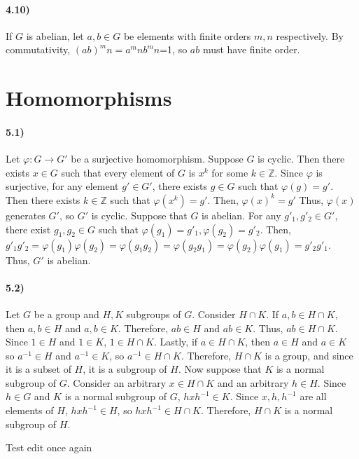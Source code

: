 \documentclass{article}
\begin{document}
\paragraph{4.10)}

If $G$ is abelian, let $a,b\in G$ be elements with finite orders $m,n$ respectively. By commutativity, $(ab)^mn=a^mnb^mn$=1, so $ab$ must have finite order.

\section{Homomorphisms}

\paragraph{5.1)}
Let $\varphi :G\to G'$ be a surjective homomorphism. Suppose $G$ is cyclic. Then there exists $x\in G$ such that every element of $G$ is $x^k$ for some $k\in \mathbb{Z}$. Since $\varphi$ is surjective, for any element $g'\in G'$, there exists $g\in G$ such that $\varphi (g)=g'$. Then there exists $k\in \mathbb{Z}$ such that $\varphi (x^k)=g'$. Then, $\varphi (x)^k=g'$ Thus, $\varphi (x)$ generates $G'$, so $G'$ is cyclic.\newline
Suppose that $G$ is abelian. For any $g'_1,g'_2\in G'$, there exist $g_1,g_2\in G$ such that $\varphi (g_1)=g'_1, \varphi (g_2)=g'_2$. Then, $g'_1g'_2=\varphi (g_1)\varphi (g_2)=\varphi (g_1g_2)=\varphi(g_2g_1)=\varphi (g_2)\varphi (g_1)=g'_2g'_1$. Thus, $G'$ is abelian.

\paragraph{5.2)}
Let $G$ be a group and $H,K$ subgroups of $G$. Consider $H\cap K$. If $a,b\in H\cap K$, then $a,b\in H$ and $a,b\in K$. Therefore, $ab\in H$ and $ab\in K$. Thus, $ab\in H\cap K$. Since $1\in H$ and $1\in K$, $1\in H\cap K$. Lastly, if $a\in H\cap K$, then $a\in H$ and $a\in K$ so $a^{-1}\in H$ and $a^{-1}\in K$, so $a^{-1}\in H\cap K$. Therefore, $H\cap K$ is a group, and since it is a subset of $H$, it is a subgroup of $H$.\newline
Now suppose that $K$ is a normal subgroup of $G$. Consider an arbitrary $x\in H\cap K$ and an arbitrary $h\in H$. Since $h\in G$ and $K$ is a normal subgroup of $G$, $hxh^{-1}\in K$. Since $x,h,h^{-1}$ are all elements of $H$,  $hxh^{-1}\in H$, so $hxh^{-1}\in H\cap K$. Therefore, $H\cap K$ is a normal subgroup of $H$.

\newline Test edit
\newline once again
\end{document}
